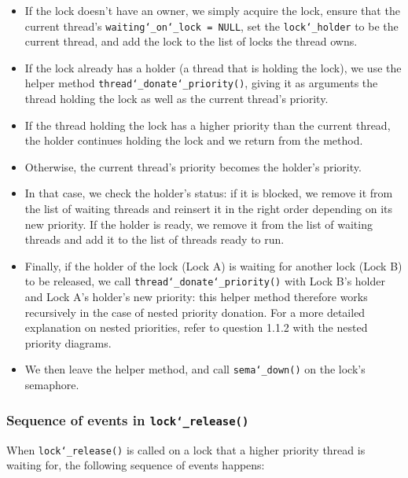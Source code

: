 \documentclass{article}
\renewcommand{\_}{\char`_}
\begin{document}
\begin{itemize}

\item If the lock doesn't have an owner, we simply acquire the lock, ensure that the current thread's \texttt{waiting\_on\_lock = NULL}, set the \texttt{lock\_holder} to be the current thread, and add the lock to the list of locks the thread owns.

\item If the lock already has a holder (a thread that is holding the lock), we use the helper method \texttt{thread\_donate\_priority()}, giving it as arguments the thread holding the lock as well as the current thread's priority.

\item If the thread holding the lock has a higher priority than the current thread, the holder continues holding the lock and we return from the method.

\item Otherwise, the current thread's priority becomes the holder's priority.

\item In that case, we check the holder's status: if it is blocked, we remove it from the list of waiting threads and reinsert it in the right order depending on its new priority. If the holder is ready, we remove it from the list of waiting threads and add it to the list of threads ready to run.

\item Finally, if the holder of the lock (Lock A) is waiting for another lock (Lock B) to be released, we call \texttt{thread\_donate\_priority()} with Lock B's holder and Lock A's holder's new priority: this helper method therefore works recursively in the case of nested priority donation. For a more detailed explanation on nested priorities, refer to question 1.1.2 with the nested priority diagrams.

\item We then leave the helper method, and call \texttt{sema\_down()} on the lock's semaphore.

\end{itemize}

\subsubsection{Sequence of events in \texttt{lock\_release()}}

When \texttt{lock\_release()} is called on a lock that a higher priority thread is waiting for, the following sequence of events happens:
\end{document}

